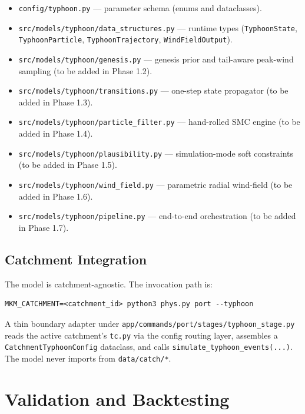 \documentclass[11pt,a4paper]{article}
\begin{document}
\begin{itemize}
  \item \texttt{config/typhoon.py} — parameter schema (enums and dataclasses).
  \item \texttt{src/models/typhoon/data\_structures.py} — runtime types
        (\texttt{TyphoonState}, \texttt{TyphoonParticle}, \texttt{TyphoonTrajectory},
        \texttt{WindFieldOutput}).
  \item \texttt{src/models/typhoon/genesis.py} — genesis prior and
        tail-aware peak-wind sampling (to be added in Phase 1.2).
  \item \texttt{src/models/typhoon/transitions.py} — one-step state
        propagator (to be added in Phase 1.3).
  \item \texttt{src/models/typhoon/particle\_filter.py} — hand-rolled SMC
        engine (to be added in Phase 1.4).
  \item \texttt{src/models/typhoon/plausibility.py} — simulation-mode
        soft constraints (to be added in Phase 1.5).
  \item \texttt{src/models/typhoon/wind\_field.py} — parametric radial
        wind-field (to be added in Phase 1.6).
  \item \texttt{src/models/typhoon/pipeline.py} — end-to-end orchestration
        (to be added in Phase 1.7).
\end{itemize}

\subsection{Catchment Integration}

The model is catchment-agnostic. The invocation path is:

\begin{verbatim}
MKM_CATCHMENT=<catchment_id> python3 phys.py port --typhoon
\end{verbatim}

A thin boundary adapter under
\texttt{app/commands/port/stages/typhoon\_stage.py} reads the active catchment's
\texttt{tc.py} via the config routing layer, assembles a
\texttt{CatchmentTyphoonConfig} dataclass, and calls
\texttt{simulate\_typhoon\_events(...)}. The model never imports from
\texttt{data/catch/*}.

\section{Validation and Backtesting}
\end{document}
